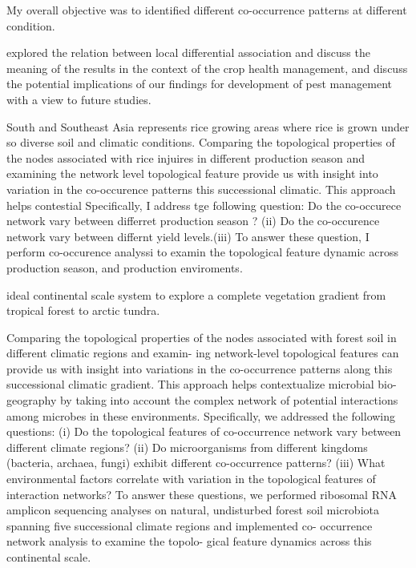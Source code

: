My overall objective was to identified different co-occurrence patterns at different condition.

explored the relation between local differential association and discuss the meaning of the results in the context of the crop health management, and discuss the potential implications of our findings for development of pest management with a view to future studies.



South and Southeast Asia represents rice growing areas where rice is grown under so diverse soil and climatic conditions. Comparing the topological properties of the nodes associated with rice injuires in different production season and examining the network level topological feature provide us with insight into variation in the co-occurence patterns  this successional climatic. This approach helps contestial  Specifically, I address tge following question: Do the co-occurece network vary between differret production season ? (ii) Do the co-occurence network vary between differnt yield levels.(iii)   To answer these question, I perform co-occurence analyssi to examin the topological feature dynamic across production season, and production enviroments.

ideal continental scale system to explore a complete vegetation gradient from tropical forest to arctic tundra. 

Comparing the topological properties of the nodes associated with forest soil in different climatic regions and examin- ing network-level topological features can provide us with insight into variations in the co-occurrence patterns along this successional climatic gradient. This approach helps contextualize microbial bio- geography by taking into account the complex network of potential interactions among microbes in these environments. Specifically, we addressed the following questions: (i) Do the topological features of co-occurrence network vary between different climate regions? (ii) Do microorganisms from different kingdoms (bacteria, archaea, fungi) exhibit different co-occurrence patterns? (iii) What environmental factors correlate with variation in the topological features of interaction networks? To answer these questions, we performed ribosomal RNA amplicon sequencing analyses on natural, undisturbed forest soil microbiota spanning five successional climate regions and implemented co- occurrence network analysis to examine the topolo- gical feature dynamics across this continental scale. 

